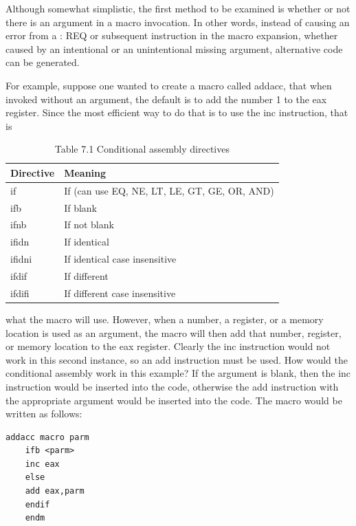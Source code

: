\documentclass[10pt]{book}
\begin{document}
Although somewhat simplistic, the first method to be examined is whether or not there is an argument in a macro invocation. In other words, instead of causing an error from a : REQ or subsequent instruction in the macro expansion, whether caused by an intentional or an unintentional missing argument, alternative code can be generated.

For example, suppose one wanted to create a macro called addacc, that when invoked without an argument, the default is to add the number 1 to the eax register. Since the most efficient way to do that is to use the inc instruction, that is

\begin{table}[htbp]
\begin{center}
\captionsetup{labelformat=empty}
\caption{Table 7.1 Conditional assembly directives}
\begin{tabular}{|l|l|}
\hline
Directive & Meaning \\

\hline
if & If (can use EQ, NE, LT, LE, GT, GE, OR, AND) \\
\hline
ifb & If blank \\
\hline
ifnb & If not blank \\
\hline
ifidn & If identical \\
\hline
ifidni & If identical case insensitive \\
\hline
ifdif & If different \\
\hline
ifdifi & If different case insensitive \\
\hline
\end{tabular}
\end{center}
\end{table}

what the macro will use. However, when a number, a register, or a memory location is used as an argument, the macro will then add that number, register, or memory location to the eax register. Clearly the inc instruction would not work in this second instance, so an add instruction must be used. How would the conditional assembly work in this example? If the argument is blank, then the inc instruction would be inserted into the code, otherwise the add instruction with the appropriate argument would be inserted into the code. The macro would be written as follows:


\begin{verbatim}
addacc macro parm
    ifb <parm>
    inc eax
    else
    add eax,parm
    endif
    endm
\end{verbatim}
\end{document}
